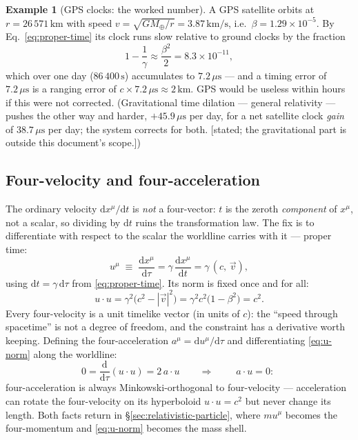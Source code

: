 \documentclass[11pt]{article}
\theoremstyle{plain}
\theoremstyle{definition}
\newtheorem{example}[theorem]{Example}
\theoremstyle{remark}
\newcommand{\dd}{\mathrm{d}}
\newcommand{\tot}[2]{\frac{\dd #1}{\dd #2}}
\begin{document}
\begin{example}[GPS clocks: the worked number]\label{ex:gps}
A GPS satellite orbits at $r = 26\,571\,\mathrm{km}$ with speed
$v = \sqrt{GM_\oplus/r} = 3.87\,\mathrm{km/s}$, i.e.\
$\beta = 1.29\times 10^{-5}$. By Eq.~\eqref{eq:proper-time} its clock
runs slow relative to ground clocks by the fraction
\begin{equation}
  1 - \frac{1}{\gamma} \approx \frac{\beta^2}{2}
  = 8.3\times 10^{-11},
\end{equation}
which over one day ($86\,400\,\mathrm{s}$) accumulates to
$7.2\,\mu\mathrm{s}$ --- and a timing error of $7.2\,\mu\mathrm{s}$ is
a ranging error of $c \times 7.2\,\mu\mathrm{s} \approx 2\,\mathrm{km}$.
GPS would be useless within hours if this were not corrected.
(Gravitational time dilation --- general relativity --- pushes the
other way and harder, $+45.9\,\mu\mathrm{s}$ per day, for a net
satellite clock \emph{gain} of $38.7\,\mu\mathrm{s}$ per day; the
system corrects for both. [stated; the gravitational part is outside
this document's scope.])
\end{example}

\subsection{Four-velocity and four-acceleration}
\label{sec:four-velocity}

The ordinary velocity $\dd x^\mu/\dd t$ is \emph{not} a four-vector:
$t$ is the zeroth \emph{component} of $x^\mu$, not a scalar, so dividing
by $\dd t$ ruins the transformation law. The fix is to differentiate
with respect to the scalar the worldline carries with it --- proper
time:
\begin{equation}
  \boxed{\;
  u^\mu \;\equiv\; \tot{x^\mu}{\tau}
  = \gamma\,\tot{x^\mu}{t}
  = \gamma\,(c,\, \vec v),
  \;}
  \label{eq:four-velocity}
\end{equation}
using $\dd t = \gamma\,\dd\tau$ from \eqref{eq:proper-time}. Its norm
is fixed once and for all:
\begin{equation}
  u \cdot u
  = \gamma^2\bigl(c^2 - |\vec v|^2\bigr)
  = \gamma^2 c^2 \bigl(1 - \beta^2\bigr)
  = c^2 .
  \label{eq:u-norm}
\end{equation}
Every four-velocity is a unit timelike vector (in units of $c$): the
``speed through spacetime'' is not a degree of freedom, and the
constraint has a derivative worth keeping. Defining the
four-acceleration $a^\mu = \dd u^\mu/\dd\tau$ and differentiating
\eqref{eq:u-norm} along the worldline:
\begin{equation}
  0 = \tot{}{\tau}(u \cdot u) = 2\, a \cdot u
  \qquad\Longrightarrow\qquad
  \boxed{\; a \cdot u = 0 : \;}
  \label{eq:a-perp-u}
\end{equation}
four-acceleration is always Minkowski-orthogonal to four-velocity ---
acceleration can rotate the four-velocity on its hyperboloid
$u \cdot u = c^2$ but never change its length. Both facts return in
\S\ref{sec:relativistic-particle}, where $mu^\mu$ becomes the
four-momentum and \eqref{eq:u-norm} becomes the mass shell.
\end{document}
